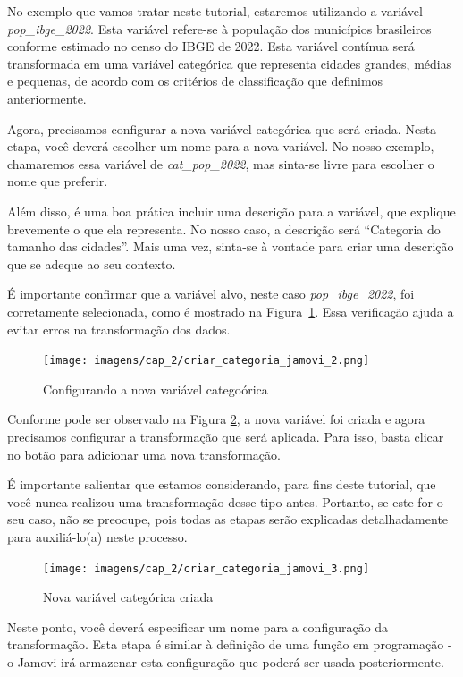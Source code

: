No exemplo que vamos tratar neste tutorial, estaremos utilizando a variável \textit{pop\_ibge\_2022}. Esta variável refere-se à população dos municípios brasileiros conforme estimado no censo do IBGE de 2022. Esta variável contínua será transformada em uma variável categórica que representa cidades grandes, médias e pequenas, de acordo com os critérios de classificação que definimos anteriormente.

Agora, precisamos configurar a nova variável categórica que será criada. Nesta etapa, você deverá escolher um nome para a nova variável. No nosso exemplo, chamaremos essa variável de \textit{cat\_pop\_2022}, mas sinta-se livre para escolher o nome que preferir. 

Além disso, é uma boa prática incluir uma descrição para a variável, que explique brevemente o que ela representa. No nosso caso, a descrição será ``Categoria do tamanho das cidades''. Mais uma vez, sinta-se à vontade para criar uma descrição que se adeque ao seu contexto.

É importante confirmar que a variável alvo, neste caso \textit{pop\_ibge\_2022}, foi corretamente selecionada, como é mostrado na Figura~\ref{fig:criar_categoria_jamovi_2}. Essa verificação ajuda a evitar erros na transformação dos dados.

\begin{figure}[H]
    \centering
    \caption{Configurando a nova variável categoórica}
    \texttt{[image: imagens/cap\_2/criar\_categoria\_jamovi\_2.png]}
    \label{fig:criar_categoria_jamovi_2}
\end{figure}

Conforme pode ser observado na Figura \ref{fig:criar_categoria_jamovi_3}, a nova variável foi criada e agora precisamos configurar a transformação que será aplicada. Para isso, basta clicar no botão para adicionar uma nova transformação.

É importante salientar que estamos considerando, para fins deste tutorial, que você nunca realizou uma transformação desse tipo antes. Portanto, se este for o seu caso, não se preocupe, pois todas as etapas serão explicadas detalhadamente para auxiliá-lo(a) neste processo.

\begin{figure}[H]
    \centering
    \caption{Nova variável categórica criada}
    \texttt{[image: imagens/cap\_2/criar\_categoria\_jamovi\_3.png]}
    \label{fig:criar_categoria_jamovi_3}
\end{figure}

Neste ponto, você deverá especificar um nome para a configuração da transformação. Esta etapa é similar à definição de uma função em programação - o Jamovi irá armazenar esta configuração que poderá ser usada posteriormente.

